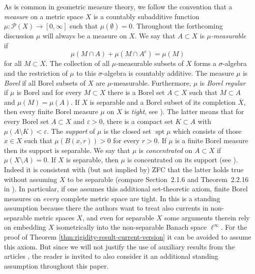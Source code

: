 \documentclass[reqno]{amsart}
\numberwithin{equation}{section}
\newcommand{\spt}{\operatorname{spt}}
\begin{document}
As is common in geometric measure theory, we follow the convention that a \emph{measure}  on  a metric space $X$ is a countably subadditive function $\mu \colon \mathcal{P}(X)\to [0,\infty]$ such that $\mu (\emptyset)=0$. Throughout the forthcoming discussion $\mu$ will always be a measure on $X$. We say that $A\subset X$ is \emph{$\mu$-measurable} if 
\[
\mu(M\cap A)+\mu(M\cap A^c)=\mu(M)
\]
for all $M\subset X$. The collection of all $\mu$-measurable subsets of $X$ forms a $\sigma$-algebra and the restriction of $\mu$ to this $\sigma$-algebra is countably additive. The measure $\mu$ is \emph{Borel} if all Borel subsets of $X$ are $\mu$-measurable. Furthermore, $\mu$ is \emph{Borel regular} if $\mu$ is Borel and for every $M\subset X$ there is a Borel set $A\subset X$ such that $M\subset A$ and $\mu(M)=\mu(A)$. If $X$ is separable and a Borel subset of its completion \(\overline{X}\), then every finite Borel measure $\mu$ on $X$ is \emph{tight}, see \cite[Theorem 3.2]{par67}). The latter means that for every Borel set $A\subset X$ and $\varepsilon >0$, there is a compact set $K\subset A$ with $\mu(A\setminus K)<\varepsilon$. The \emph{support} of $\mu$ is the closed set $\spt \mu$ which consists of those $x\in X$ such that \(\mu(B(x,r))>0\) for every \(r>0\). If $\mu$ is a finite Borel measure then its support is separable. We say that $\mu$ is \emph{concentrated} on $A\subset X$ if $\mu(X\setminus A)=0$. If $X$ is separable, then $\mu$ is concentrated on its support (see \cite[Theorem 2.2.16]{fed69}). Indeed it is consistent with (but not implied by) ZFC that the latter holds true without assuming $X$ to be separable (compare Section~2.1.6 and Theorem~2.2.16 in \cite{fed69}). In particular, if one assumes this additional set-theoretic axiom, finite Borel measures on \emph{every} complete metric space are tight. In \cite{amb00, Bonicatto-Del-Nin-Pasqualetto-2022} this is a standing assumption because there the authors want to treat also currents in non-separable metric spaces $X$, and even for separable $X$ some arguments therein rely on embedding $X$ isometrically into the non-separable Banach space $\ell^\infty$. For the proof of Theorem \ref{thm:rigidity-result-current-version} it can be avoided to assume this axiom. But since we will not justify the use of auxiliary results from the articles \cite{amb00, Bonicatto-Del-Nin-Pasqualetto-2022}, the reader is invited to also consider it an additional standing assumption throughout this paper.
\end{document}
